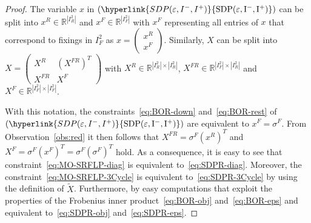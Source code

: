 \documentclass{article}
\newcommand{\myrefmath}[1]{(\hyperlink{#1}{\mathrm{#1}})}
\begin{document}
\begin{proof}
    The variable $x$ in $\myrefmath{SDP(\varepsilon,I^-,I^+)}$ can be split into $x^R \in \mathbb R^{|I^2_R|}$ and $x^F \in \mathbb R^{|I^2_F|}$ with $x^F$ representing all entries of $x$ that correspond to fixings in $I^2_F$ as 
    $x=\begin{pmatrix} x^R \\ x^F \end{pmatrix}$. 
    Similarly, $X$ can be split into 
    $X=\begin{pmatrix} X^R & (X^{FR})^T\\ X^{FR} & X^F \end{pmatrix}$ with $X^R \in \mathbb R^{|I^2_R|\times|I^2_R|}$, $X^{FR} \in \mathbb R^{|I^2_F|\times|I^2_R|}$ and $X^F \in \mathbb R^{|I^2_F|\times|I^2_F|}$.

    With this notation, the constraints~\eqref{eq:BOR-down} and~\eqref{eq:BOR-rest} of $\myrefmath{SDP(\varepsilon,I^-,I^+)}$ are equivalent to $x^F = \sigma^F$. From Observation~\ref{obs:red} it then follows that $X^{FR} = \sigma^F(x^R)^T$ and $X^F = \sigma^F(x^F)^T =\sigma^F(\sigma^F)^T$ hold.
    As a consequence, it is easy to see that constraint~\eqref{eq:MO-SRFLP-diag} is equivalent to~\eqref{eq:SDPR-diag}. Moreover, the constraint~\eqref{eq:MO-SRFLP-3Cycle} is equivalent to~\eqref{eq:SDPR-3Cycle} by using the definition of $\widetilde{X}$. 
    Furthermore, by easy computations that exploit the properties of the Frobenius inner product~\eqref{eq:BOR-obj} and~\eqref{eq:BOR-eps} and equivalent to~\eqref{eq:SDPR-obj} and~\eqref{eq:SDPR-eps}.
    

\end{proof}
\end{document}
